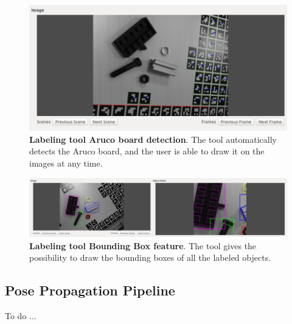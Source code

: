 \begin{figure}
    \centering
    \includegraphics[width=\textwidth]{figures/3_raw_dataset/labeltool_detail_1}
    \caption{\textbf{Labeling tool Aruco board detection}. The tool automatically detects the Aruco board, and the user is able to draw it on the images at any time.}
    \label{fig:labeltool_detail_1}
\end{figure}

\begin{figure}
    \centering
    \includegraphics[width=\textwidth]{figures/3_raw_dataset/labeltool_detail_2}
    \caption{\textbf{Labeling tool Bounding Box feature}. The tool gives the possibility to draw the bounding boxes of all the labeled objects.}
    \label{fig:labeltool_detail_2}
\end{figure}

\subsection{Pose Propagation Pipeline}\label{subsec:pose_propagation}
To do ...